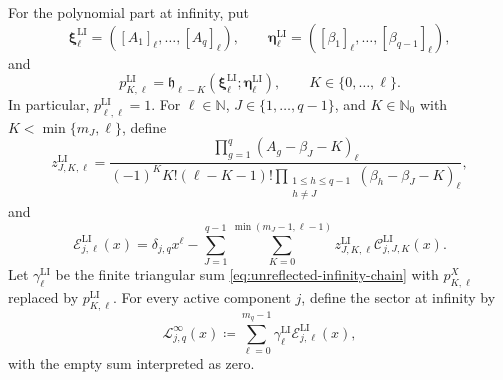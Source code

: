 \documentclass[10pt]{amsart}
\newcommand{\Nzero}{\mathbb N_0}
\theoremstyle{plain}
\theoremstyle{definition}
\theoremstyle{remark}
\begin{document}
For the polynomial part at infinity, put
\begin{equation}
 \boldsymbol\xi_\ell^{\mathrm{LI}}
 =([A_1]_\ell,\ldots,[A_q]_\ell),
 \qquad
 \boldsymbol\eta_\ell^{\mathrm{LI}}
 =([\beta_1]_\ell,\ldots,[\beta_{q-1}]_\ell),
 \label{eq:LI-infinity-strings}
\end{equation}
and
\begin{equation}
 p_{K,\ell}^{\mathrm{LI}}
 =\mathfrak h_{\ell-K}
 (\boldsymbol\xi_\ell^{\mathrm{LI}};
  \boldsymbol\eta_\ell^{\mathrm{LI}}),
 \qquad K\in\{0,\ldots,\ell\}.
 \label{eq:LI-infinity-transition}
\end{equation}
In particular, \(p_{\ell,\ell}^{\mathrm{LI}}=1\). For
\(\ell\in\mathbb N\), \(J\in\{1,\ldots,q-1\}\), and
\(K\in\Nzero\) with \(K<\min\{m_J,\ell\}\), define
\begin{equation}
 z_{J,K,\ell}^{\mathrm{LI}}
 =\frac{\prod_{g=1}^{q}(A_g-\beta_J-K)_\ell}
 {(-1)^K K!(\ell-K-1)!
  \prod_{\substack{1\le h\le q-1\\h\ne J}}
  (\beta_h-\beta_J-K)_\ell},
 \label{eq:LI-base-residue}
\end{equation}
and
\begin{equation}
 \mathcal E_{j,\ell}^{\mathrm{LI}}(x)
 =\delta_{j,q}x^\ell
 -\sum_{J=1}^{q-1}\sum_{K=0}^{\min(m_J-1,\ell-1)}
 z_{J,K,\ell}^{\mathrm{LI}}
 \mathcal C_{j,J,K}^{\mathrm{LI}}(x).
 \label{eq:LI-corrected-infinity-vector}
\end{equation}
Let \(\gamma_\ell^{\mathrm{LI}}\) be the finite triangular sum
\eqref{eq:unreflected-infinity-chain} with
\(p_{K,\ell}^X\) replaced by \(p_{K,\ell}^{\mathrm{LI}}\).
For every active component \(j\), define the sector at infinity by
\begin{equation}
 \mathscr L_{j,q}^{\infty}(x)
 \coloneq
 \sum_{\ell=0}^{m_q-1}\gamma_\ell^{\mathrm{LI}}
 \mathcal E_{j,\ell}^{\mathrm{LI}}(x),
 \label{eq:LI-infinity-block-definition}
\end{equation}
with the empty sum interpreted as zero.
\end{document}
